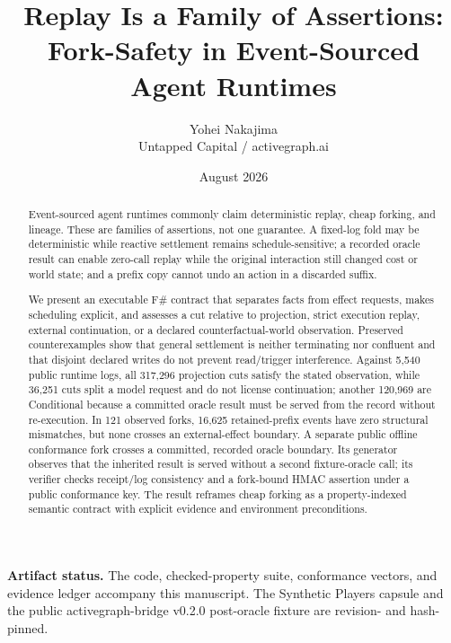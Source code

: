 \documentclass[11pt]{article}
\title{Replay Is a Family of Assertions:\\
Fork-Safety in Event-Sourced Agent Runtimes}
\author{Yohei Nakajima\\Untapped Capital / activegraph.ai}
\date{August 2026}
\begin{document}
\maketitle

\begin{abstract}
Event-sourced agent runtimes commonly claim deterministic replay, cheap
forking, and lineage.  These are families of assertions, not one guarantee.  A
fixed-log fold may be deterministic while reactive settlement remains
schedule-sensitive; a recorded oracle result can enable zero-call replay while
the original interaction still changed cost or world state; and a prefix copy
cannot undo an action in a discarded suffix.

We present an executable F\# contract that separates facts from effect
requests, makes scheduling explicit, and assesses a cut relative to projection,
strict execution replay, external continuation, or a declared
counterfactual-world observation.  Preserved counterexamples show that general
settlement is neither terminating nor confluent and that disjoint declared
writes do not prevent read/trigger interference.  Against 5,540 public runtime
logs, all 317,296 projection cuts satisfy the stated observation, while 36,251
cuts split a model request and do not license continuation; another 120,969
are Conditional because a committed oracle result must be served from the
record without re-execution.  In 121 observed forks, 16,625 retained-prefix
events have zero structural mismatches, but none crosses an external-effect
boundary.  A separate public offline conformance fork crosses a committed,
recorded oracle boundary.  Its generator observes that the inherited result is
served without a second fixture-oracle call; its verifier checks receipt/log
consistency and a fork-bound HMAC assertion under a public conformance key.  The
result reframes cheap forking as a property-indexed semantic contract with
explicit evidence and environment preconditions.
\end{abstract}

\noindent\textbf{Artifact status.}
The code, checked-property suite, conformance vectors, and evidence ledger
accompany this manuscript.  The Synthetic Players capsule and the public
activegraph-bridge v0.2.0 post-oracle fixture are revision- and hash-pinned.















\end{document}
